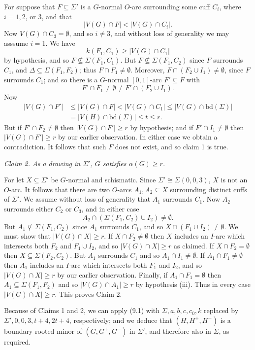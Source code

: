 For suppose that $F \subseteq \Sigma'$ is a $G$-normal $O$-arc surrounding some cuff $C_i$, where $i = 1, 2$, or $3$, and that
\begin{equation*}
|V(G) \cap F| < |V(G) \cap C_i|.
\end{equation*}
Now $V(G) \cap C_3 = \emptyset$, and so $i \ne 3$, and without loss of generality we may asssume $i = 1$. We have
\begin{equation*}
k(F_1, C_1) \ge |V(G) \cap C_1|
\end{equation*}
by hypothesis, and so $F \not\subseteq \Sigma(F_1, C_1)$. But $F \not\subseteq \Sigma(F_1, C_2)$ since $F$ surrounds $C_1$, and $\Delta \subseteq \Sigma(F_1, F_2)$; thus $F \cap F_1 \ne \emptyset$. Moreover, $F \cap (F_2 \cup I_1) \ne \emptyset$, since $F$ surrounds $C_1$; and so there is a $G$-normal $[0, 1]$-arc $F' \subseteq F$ with
\begin{equation*}
F' \cap F_1 \ne \emptyset \ne F' \cap (F_2 \cup I_1).
\end{equation*}
Now
\begin{align*}
|V(G) \cap F'| &\le |V(G) \cap F| < |V(G) \cap C_1| \le |V(G) \cap \mathrm{bd}(\Sigma)| \\
&= |V(H) \cap \mathrm{bd}(\Sigma)| \le t \le r.
\end{align*}
But if $F' \cap F_2 \ne \emptyset$ then $|V(G) \cap F'| \ge r$ by hypothesis; and if $F' \cap I_1 \ne \emptyset$ then $|V(G) \cap F'| \ge r$ by our earlier observation. In either case we obtain a contradiction. It follows that such $F$ does not exist, and so claim 1 is true.

\textit{Claim 2. As a drawing in $\Sigma'$, $G$ satisfies $\alpha(G) \ge r$.}

For let $X \subseteq \Sigma'$ be $G$-normal and schismatic. Since $\Sigma' \cong \Sigma(0, 0, 3)$, $X$ is not an $O$-arc. It follows that there are two $O$-arcs $A_1, A_2 \subseteq X$ surrounding distinct cuffs of $\Sigma'$. We assume without loss of generality that $A_1$ surrounds $C_1$. Now $A_2$ surrounds either $C_2$ or $C_3$, and in either case
\begin{equation*}
A_2 \cap (\Sigma(F_1, C_2) \cup I_2) \ne \emptyset.
\end{equation*}
But $A_1 \not\subseteq \Sigma(F_1, C_2)$ since $A_1$ surrounds $C_1$, and so $X \cap (F_1 \cup I_2) \ne \emptyset$. We must show that $|V(G) \cap X| \ge r$. If $X \cap F_2 \ne \emptyset$ then $X$ includes an $I$-arc which intersects both $F_2$ and $F_1 \cup I_2$, and so $|V(G) \cap X| \ge r$ as claimed. If $X \cap F_2 = \emptyset$ then $X \subseteq \Sigma(F_2, C_2)$. But $A_1$ surrounds $C_1$ and so $A_1 \cap I_1 \ne \emptyset$. If $A_1 \cap F_1 \ne \emptyset$ then $A_1$ includes an $I$-arc which intersects both $F_1$ and $I_2$, and so $|V(G) \cap X| \ge r$ by our earlier observation. Finally, if $A_1 \cap F_1 = \emptyset$ then $A_1 \subseteq \Sigma(F_1, F_2)$ and so $|V(G) \cap A_1| \ge r$ by hypothesis (iii). Thus in every case $|V(G) \cap X| \ge r$. This proves Claim 2.

Because of Claims 1 and 2, we can apply (9.1) with $\Sigma, a, b, c, c_0, k$ replaced by $\Sigma', 0, 0, 3, t+4, 2t+4$, respectively; and we deduce that $(H, H^+, H^-)$ is a boundary-rooted minor of $(G, G^+, G^-)$ in $\Sigma'$, and therefore also in $\Sigma$, as required.
